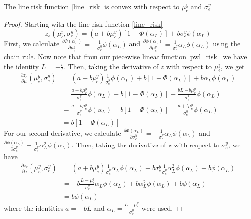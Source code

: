 \begin{lemma}
The line risk function \ref{line_risk} is convex with respect to $\mu^y_e$ and $\sigma^y_e$
\end{lemma}
\begin{proof}
Starting with the line risk function \ref{line_risk}
\begin{equation*}
z_e(\mu^y_e,\sigma^y_e) = (a + b \mu^y_e)\left[ 1 - \Phi(\alpha_L) \right]  + b \sigma^y_e \phi(\alpha_L) 
\end{equation*}
First, we calculate $\frac{\partial \Phi(\alpha_L)}{\partial \mu^y_e} = - \frac{1}{\sigma^y_e} \phi(\alpha_L)$ and $\frac{\partial \phi(\alpha_L)}{\partial \mu^y_e} =  \frac{1}{\sigma^y_e} \alpha_L \phi(\alpha_L)$ using the chain rule.  Now note that from our piecewise linear function \ref{pwl_risk}, we have the identity $L = -\frac{a}{b}$. Then, taking the derivative of $z$ with respect to $\mu^y_e$, we get  
\begin{align*}
\frac{\partial z_e}{\partial \mu}(\mu^y_e,\sigma^y_e) &= (a + b \mu^y_e) \frac{1}{\sigma^y_e} \phi(\alpha_L) + b \left[ 1 - \Phi(\alpha_L) \right] + b \alpha_L \phi(\alpha_L)\\
&= \frac{a + b \mu^y_e}{\sigma^y_e}\phi(\alpha_L)  + b \left[ 1 - \Phi(\alpha_L) \right] +  \frac{bL - b\mu^y_e}{\sigma^y_e}\phi(\alpha_L) \\
&= \frac{a + b \mu^y_e}{\sigma^y_e}\phi(\alpha_L)  + b \left[ 1 - \Phi(\alpha_L) \right] -  \frac{a + b\mu^y_e}{\sigma^y_e}\phi(\alpha_L)\\
& = b\left[ 1 - \Phi(\alpha_L) \right]
\end{align*}
For our second derivative, we calculate $\frac{\partial \Phi(\alpha_L)}{\partial \sigma^y_e} = - \frac{1}{\sigma^y_e} \alpha_L \phi(\alpha_L)$ and $\frac{\partial \phi(\alpha_L)}{\partial \sigma^y_e} =  \frac{1}{\sigma^y_e} \alpha_L^2 \phi(\alpha_L)$.  Then, taking the derivative of $z$ with respect to $\sigma^y_e$, we have
\begin{align*}
\frac{\partial z_e}{\partial \sigma}(\mu^y_e,\sigma^y_e) & = (a+b\mu^y_e)\frac{1}{\sigma^y_e} \alpha_L  \phi(\alpha_L) + b \sigma^y_e \frac{1}{\sigma^y_e} \alpha_L^2  \phi(\alpha_L) + b \phi(\alpha_L)\\
& = -b\frac{L-\mu^y_e}{\sigma^y_e} \alpha_L  \phi(\alpha_L) + b \alpha_L^2  \phi(\alpha_L) + b \phi(\alpha_L)\\
 & = b \phi(\alpha_L) 
\end{align*} 
where the identities $a=-bL$ and $\alpha_L = \frac{L-\mu^y_e}{\sigma^y_e}$ were used.


\end{proof}
